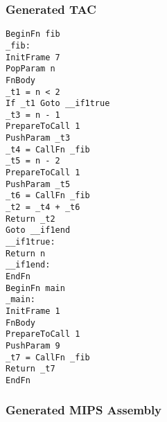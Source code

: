 \subsubsection{Generated TAC}
\begin{lstlisting}[showstringspaces=false,breaklines=true,backgroundcolor=\color{light-gray}, captionpos=b]
BeginFn fib
_fib:
InitFrame 7
PopParam n
FnBody
_t1 = n < 2
If _t1 Goto __if1true
_t3 = n - 1
PrepareToCall 1
PushParam _t3
_t4 = CallFn _fib
_t5 = n - 2
PrepareToCall 1
PushParam _t5
_t6 = CallFn _fib
_t2 = _t4 + _t6
Return _t2
Goto __if1end
__if1true:
Return n
__if1end:
EndFn
BeginFn main
_main:
InitFrame 1
FnBody
PrepareToCall 1
PushParam 9
_t7 = CallFn _fib
Return _t7
EndFn

\end{lstlisting}\subsubsection{Generated MIPS Assembly}
